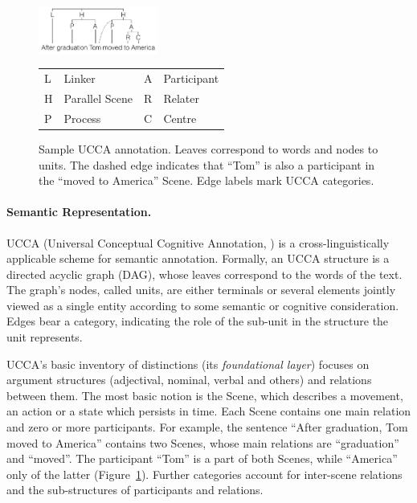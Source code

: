 \documentclass[11pt,letterpaper]{article}
\newcommand{\figref}[1]{Figure~\ref{#1}}
\def\inparcite#1{\cite{#1}}
\begin{document}
\begin{figure}
    \begin{center}
    \includegraphics[width=0.35\textwidth]{ucca-tree-v3.png}

{\small
  \begin{tabular}{|l|l|l|l|}
\hline
L & Linker &  A & Participant \\
H & Parallel Scene & R & Relater \\
P & Process & C & Centre \\
\hline
\end{tabular}
}
    \end{center}
\caption{\label{fig:ucca_example_v2}
  Sample UCCA annotation. Leaves correspond to words and nodes to units.
  The dashed edge indicates that ``Tom'' is also a participant in the ``moved to America''
  Scene. Edge labels mark UCCA categories.}
\end{figure}

\paragraph{Semantic Representation.}
UCCA (Universal Conceptual Cognitive Annotation, \inparcite{abend2013universal}) is a
cross-linguistically applicable scheme for semantic annotation.
Formally, an UCCA structure is a directed acyclic graph (DAG),
whose leaves correspond to the words of the text.
The graph's nodes, called {\sc units}, are either terminals or several elements jointly
viewed as a single entity according to some semantic or cognitive consideration. Edges bear
a category, indicating the role of the sub-unit in the structure the unit
represents.

UCCA's basic inventory of distinctions (its {\it foundational layer})
focuses on argument structures (adjectival, nominal, verbal and others)
and relations between them. The most basic notion is the Scene, which describes a movement, an
action or a state which persists in time. Each Scene contains one main
relation and zero or more participants. For example, the sentence ``After graduation, Tom moved to America''
contains two Scenes, whose main relations are ``graduation'' and ``moved''.
The participant ``Tom'' is a part of both Scenes, while ``America'' only of the
latter (\figref{fig:ucca_example_v2}). Further categories account for
inter-scene relations and the sub-structures of participants and relations.
\end{document}
